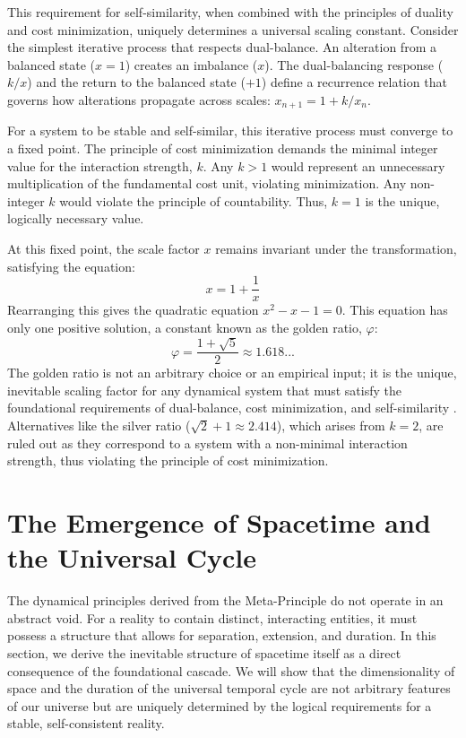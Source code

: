 This requirement for self-similarity, when combined with the principles of duality and cost minimization, uniquely determines a universal scaling constant. Consider the simplest iterative process that respects dual-balance. An alteration from a balanced state (\(x=1\)) creates an imbalance (\(x\)). The dual-balancing response (\(k/x\)) and the return to the balanced state (\(+1\)) define a recurrence relation that governs how alterations propagate across scales: \(x_{n+1} = 1 + k/x_n\).

For a system to be stable and self-similar, this iterative process must converge to a fixed point. The principle of cost minimization demands the minimal integer value for the interaction strength, \(k\). Any \(k>1\) would represent an unnecessary multiplication of the fundamental cost unit, violating minimization. Any non-integer \(k\) would violate the principle of countability. Thus, \(k=1\) is the unique, logically necessary value.

At this fixed point, the scale factor \(x\) remains invariant under the transformation, satisfying the equation:
\begin{equation}
x = 1 + \frac{1}{x}
\end{equation}
Rearranging this gives the quadratic equation \(x^2 - x - 1 = 0\). This equation has only one positive solution, a constant known as the golden ratio, \(\varphi\):
\begin{equation}
\varphi = \frac{1 + \sqrt{5}}{2} \approx 1.618...
\end{equation}
The golden ratio is not an arbitrary choice or an empirical input; it is the unique, inevitable scaling factor for any dynamical system that must satisfy the foundational requirements of dual-balance, cost minimization, and self-similarity \parencite{Livio2002}. Alternatives like the silver ratio (\(\sqrt{2}+1 \approx 2.414\)), which arises from \(k=2\), are ruled out as they correspond to a system with a non-minimal interaction strength, thus violating the principle of cost minimization.

\section{The Emergence of Spacetime and the Universal Cycle}

The dynamical principles derived from the Meta-Principle do not operate in an abstract void. For a reality to contain distinct, interacting entities, it must possess a structure that allows for separation, extension, and duration. In this section, we derive the inevitable structure of spacetime itself as a direct consequence of the foundational cascade. We will show that the dimensionality of space and the duration of the universal temporal cycle are not arbitrary features of our universe but are uniquely determined by the logical requirements for a stable, self-consistent reality.

